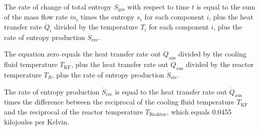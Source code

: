 The rate of change of total entropy \( S_{\text{ges}} \) with respect to time \( t \) is equal to the sum of the mass flow rate \( \dot{m}_i \) times the entropy \( s_i \) for each component \( i \), plus the heat transfer rate \( \dot{Q}_i \) divided by the temperature \( T_i \) for each component \( i \), plus the rate of entropy production \( \dot{S}_{\text{ere}} \).

The equation zero equals the heat transfer rate out \( \dot{Q}_{\text{aus}} \) divided by the cooling fluid temperature \( T_{\text{KF}} \), plus the heat transfer rate out \( \dot{Q}_{\text{aus}} \) divided by the reactor temperature \( T_R \), plus the rate of entropy production \( \dot{S}_{\text{ere}} \).

The rate of entropy production \( \dot{S}_{\text{ere}} \) is equal to the heat transfer rate out \( \dot{Q}_{\text{aus}} \) times the difference between the reciprocal of the cooling fluid temperature \( T_{\text{KF}} \) and the reciprocal of the reactor temperature \( T_{\text{Reaktor}} \), which equals 0.0455 kilojoules per Kelvin.